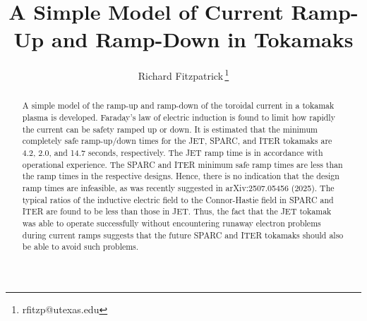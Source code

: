 \documentclass[12pt,prb,aps]{revtex4-1}
\begin{document}
\title{A Simple Model of Current Ramp-Up and Ramp-Down in Tokamaks}
\author{Richard Fitzpatrick\,\footnote{rfitzp@utexas.edu}}

\begin{abstract}
A simple model of the ramp-up and ramp-down of the toroidal current in a tokamak plasma is developed. Faraday's law of electric induction
is found to limit how rapidly the current can be safety ramped up or down. It is estimated that the minimum completely safe ramp-up/down times for the JET, SPARC, and
ITER tokamaks are 4.2, 2.0, and 14.7 seconds, respectively. The JET ramp time is in accordance with operational experience. The SPARC
and ITER minimum safe ramp times are less than the ramp times in the respective designs. Hence, there is no indication that the design ramp times are infeasible, as was recently 
suggested  in arXiv:2507.05456 (2025).
The typical ratios of the inductive electric field
to the Connor-Hastie field in SPARC and ITER are found to be less than those in JET. Thus, the fact that the JET tokamak was able to operate successfully
without encountering runaway electron problems during current ramps suggests that the future SPARC and ITER tokamaks should also be able to
avoid such problems. 
\end{abstract}
\maketitle
\end{document}
